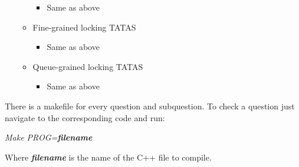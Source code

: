 \begin{itemize}
\begin{itemize}
\begin{itemize}
                    \item Same as above
                \end{itemize}
            \item Fine-grained locking TATAS
                \begin{itemize}
                    \item Same as above
                \end{itemize}
            \item Queue-grained locking TATAS
                \begin{itemize}
                    \item Same as above
                \end{itemize}
        \end{itemize}
\end{itemize}

There is a makefile for every question and subquestion. To check a question
just navigate to the corresponding code and run:

\begin{center}
    \textit{Make PROG=\textbf{filename}}
\end{center}

Where \textit{\textbf{filename}} is the name of the C++ file to compile.